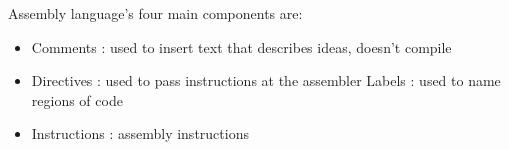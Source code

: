 \documentclass{article}
\begin{document}
\noindent Assembly language's four main components are:
\begin{itemize}
\item Comments : used to insert text that describes ideas, doesn't compile
\item Directives : used to pass instructions at the assembler
\Item Labels : used to name regions of code
\item Instructions : assembly instructions
\end{itemize}
\end{document}

